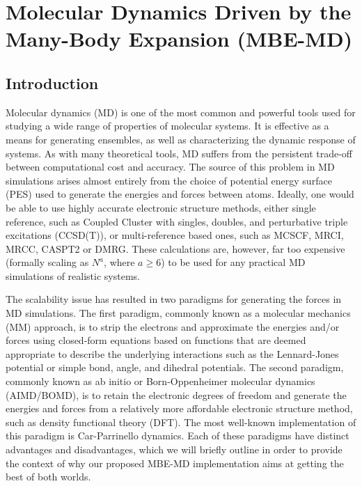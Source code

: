 \documentclass[11pt, proquest]{uwthesis}[2020/02/24]
\begin{document}
\chapter{Molecular Dynamics Driven by the Many-Body Expansion (MBE-MD)}
\label{ch:MBE_MD}

\section{Introduction}

\par Molecular dynamics (MD) is one of the most common and powerful tools used for studying a wide range of properties of molecular systems.\autocite{bankura_hydration_2013,bernardi_enhanced_2015,durrant_molecular_2011,hospital_molecular_2015,probst_molecular_1985} It is effective as a means for generating ensembles, as well as characterizing the dynamic response of systems. As with many theoretical tools, MD suffers from the persistent trade-off between computational cost and accuracy. The source of this problem in MD simulations arises almost entirely from the choice of potential energy surface (PES) used to generate the energies and forces between atoms. Ideally, one would be able to use highly accurate electronic structure methods, either single reference, such as Coupled Cluster with singles, doubles, and perturbative triple excitations (CCSD(T)),\autocite{bartlett_coupled-cluster_1989} or multi-reference based ones, such as MCSCF\autocite{schmidt_construction_1998}, MRCI\autocite{werner_selfconsistent_1982}, MRCC\autocite{mukherjee_linked-cluster_1986}, CASPT2\autocite{finley_multi-state_1998} or DMRG.\autocite{schollwock_density-matrix_2005} These calculations are, however, far too expensive (formally scaling as $N^a$, where $a \geq 6$) to be used for any practical MD simulations of realistic systems.

\par The scalability issue has resulted in two paradigms for generating the forces in MD simulations. The first paradigm, commonly known as a molecular mechanics (MM)\autocite{karplus_molecular_2005,karplus_molecular_2002,karplus_molecular_1990,rappe_uff_1992,engler_critical_1973,still_semianalytical_1990} approach, is to strip the electrons and approximate the energies and/or forces using closed-form equations based on functions that are deemed appropriate to describe the underlying interactions such as the Lennard-Jones potential or simple bond, angle, and dihedral potentials. The second paradigm, commonly known as ab initio or Born-Oppenheimer molecular dynamics (AIMD/BOMD),\autocite{car_unified_1985,barnett_born-oppenheimer_1993,worth_beyond_2004,li_ab_2005,tuckerman_ab_1996} is to retain the electronic degrees of freedom and generate the energies and forces from a relatively more affordable electronic structure method, such as density functional theory (DFT). The most well-known implementation of this paradigm is Car-Parrinello dynamics.\autocite{car_unified_1985} Each of these paradigms have distinct advantages and disadvantages, which we will briefly outline in order to provide the context of why our proposed MBE-MD implementation aims at getting the best of both worlds.
\end{document}
